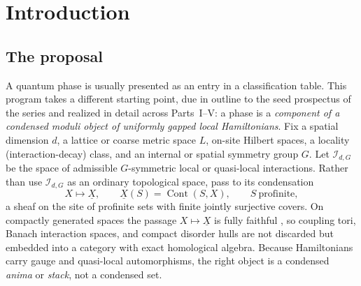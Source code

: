 \documentclass[12pt]{article}
\newcommand{\cond}[1]{\underline{#1}}          %
\newcommand{\Cont}{\operatorname{Cont}}        %
\newcommand{\Int}{\mathcal{I}}                 %
\theoremstyle{plain}
\theoremstyle{definition}
\theoremstyle{remark}
\begin{document}
\tableofcontents

\section{Introduction}
\label{sec:intro}

\subsection{The proposal}
\label{sec:proposal}

A quantum phase is usually presented as an entry in a classification table. This
program takes a different starting point, due in outline to the seed prospectus of the
series and realized in detail across Parts~I--V\@: a phase is a \emph{component of a
condensed moduli object of uniformly gapped local Hamiltonians}. Fix a spatial
dimension $d$, a lattice or coarse metric space $L$, on-site Hilbert spaces, a locality
(interaction-decay) class, and an internal or spatial symmetry group $G$. Let
$\Int_{d,G}$ be the space of admissible $G$-symmetric local or quasi-local
interactions. Rather than use $\Int_{d,G}$ as an ordinary topological space, pass to
its condensation
\begin{equation}
\label{eq:condensation}
X\longmapsto\cond{X},\qquad \cond{X}(S)=\Cont(S,X),\qquad S\ \text{profinite},
\end{equation}
a sheaf on the site of profinite sets with finite jointly surjective covers. On
compactly generated spaces the passage $X\mapsto\cond{X}$ is fully faithful
\cite{clausen-scholze-condensed,barwick-haine-pyknotic}, so coupling tori, Banach
interaction spaces, and compact disorder hulls are not discarded but embedded into a
category with exact homological algebra. Because Hamiltonians carry gauge and
quasi-local automorphisms, the right object is a condensed \emph{anima} or
\emph{stack}, not a condensed set.
\end{document}
